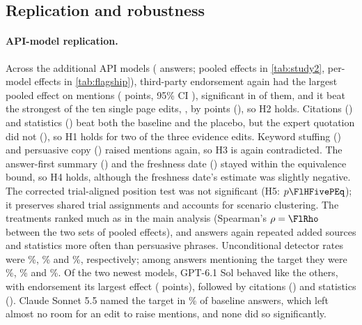 \subsection{Replication and robustness}
\label{sec:robust}

\paragraph{API-model replication.} Across the \FlNModelsTwo{} additional API models (\FlNResponsesTwo{} answers;
pooled effects in \cref{tab:study2}, per-model effects in \cref{tab:flagship}), third-party endorsement again had the
largest pooled effect on mentions (\FlEMenAllThirdParty{} points, 95\% CI \FlEMenAllThirdPartyCI), significant in \FlNSigThirdPartyW{}
of them, and it beat the strongest of the ten single page edits, \FlHTwoBest, by \FlHTwoDiffU{} points (\FlHTwoDiffCI), so
H2 holds. Citations (\FlEMenAllCitations) and statistics (\FlEMenAllStatistics) beat both the baseline and the placebo,
but the expert quotation did not (\FlEMenAllQuotation), so H1 holds for two of the three evidence edits. Keyword
stuffing (\FlEMenAllKeywordStuffing) and persuasive copy (\FlEMenAllPersuasive) raised mentions again, so H3 is again
contradicted. The answer-first summary (\FlEMenAllAnswerFirst) and the freshness date (\FlEMenAllFreshness) stayed
within the equivalence bound, so H4 holds, although the freshness date's estimate was slightly negative. The corrected trial-aligned position test was not significant (H5: $p \FlHFivePEq$); it preserves shared trial
assignments and accounts for scenario clustering. The treatments
ranked much as in the main analysis (Spearman's $\rho = \FlRho$ between the two sets of pooled effects), and answers
again repeated added sources and statistics more often than persuasive phrases. Unconditional detector rates were
\FlAbsRawCitationsAll\%, \FlAbsRawStatisticsAll\% and \FlAbsRawPersuasiveAll\%, respectively; among answers
mentioning the target they were \FlAbsCitationsAll\%, \FlAbsStatisticsAll\% and \FlAbsPersuasiveAll\%. Of the two newest models, GPT-6.1 Sol behaved like the others, with
endorsement its largest effect (\FlEMenGptsixThirdParty{} points), followed by citations (\FlEMenGptsixCitations) and
statistics (\FlEMenGptsixStatistics). Claude Sonnet 5.5 named the target in \FlBaseMenSonnetfive\% of baseline answers,
which left almost no room for an edit to raise mentions, and none did so significantly.

